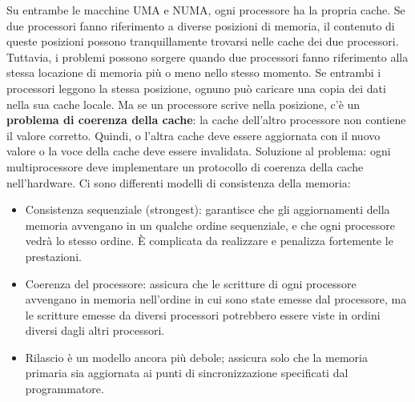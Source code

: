 \documentclass[10pt,a4paper]{article}
\begin{document}
Su entrambe le macchine UMA e NUMA, ogni processore ha la propria cache. Se due processori fanno riferimento a diverse posizioni di memoria, il contenuto di queste posizioni possono tranquillamente trovarsi nelle cache dei due processori. Tuttavia, i problemi possono sorgere quando due processori fanno riferimento alla stessa locazione di memoria più o meno nello stesso momento.
Se entrambi i processori leggono la stessa posizione, ognuno può caricare una copia dei dati nella sua cache locale. Ma se un processore scrive nella posizione, c'è un \textbf{problema di coerenza della cache}: la cache dell'altro processore non contiene il valore corretto. Quindi, o l'altra cache deve essere aggiornata con il nuovo valore o la voce della cache deve essere invalidata. Soluzione al problema: ogni multiprocessore
deve implementare un protocollo di coerenza della cache nell'hardware.
Ci sono differenti modelli di consistenza della memoria:
\begin{itemize}
\item Consistenza sequenziale (strongest): garantisce che gli aggiornamenti della memoria avvengano in un qualche ordine sequenziale, e che ogni processore vedrà lo stesso ordine. \`{E} complicata da realizzare e penalizza fortemente le prestazioni.
\item Coerenza del processore: assicura che le scritture di ogni processore avvengano in memoria
nell'ordine in cui sono state emesse dal processore, ma le scritture emesse da diversi 
processori potrebbero essere viste in ordini diversi dagli altri processori.
\item Rilascio è un modello ancora più debole; assicura solo che la memoria primaria sia aggiornata ai punti di sincronizzazione specificati dal programmatore.
\end{itemize}
\end{document}
